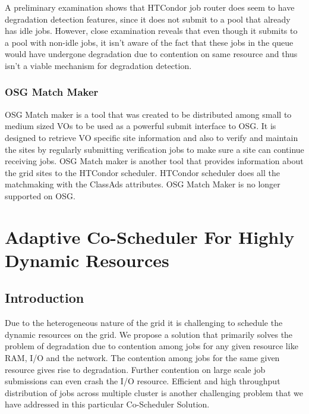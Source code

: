 \documentclass[ms,electronic,double]{nuthesis}
\begin{document}
A preliminary examination shows that HTCondor job router does seem to have degradation detection features, 
since it does not submit to a pool that already has idle jobs. However, close examination reveals that even though it
submits to a pool with non-idle jobs, it isn't aware of the fact that these jobs in the queue would have 
undergone degradation due to contention on same resource and thus isn't a viable mechanism for degradation detection.

\subsection{OSG Match Maker}

OSG Match maker is a tool that was created to be distributed among small to 
medium sized VOs to be used as a powerful submit interface to OSG. It is 
designed to retrieve VO specific site information and also to verify and 
maintain the sites by regularly submitting verification jobs to make sure a site 
can continue receiving jobs.
OSG Match maker is another tool that provides information about the grid sites to the 
HTCondor scheduler. HTCondor scheduler does all the matchmaking with the ClassAds attributes. 
OSG Match Maker is no longer supported on OSG.
  

\chapter{Adaptive Co-Scheduler For Highly Dynamic Resources}

\section{Introduction}
Due to the heterogeneous nature of the grid it is challenging to schedule the dynamic resources on the grid. 
We propose a solution that primarily solves the problem of degradation due to contention among 
jobs for any given resource like RAM, I/O and the network. The contention among jobs for the same given
resource gives rise to degradation. Further contention on large scale job submissions can even crash the I/O resource.
 Efficient and high throughput
distribution of jobs across multiple cluster is another challenging problem that we have addressed in 
this particular Co-Scheduler Solution. 
\end{document}
